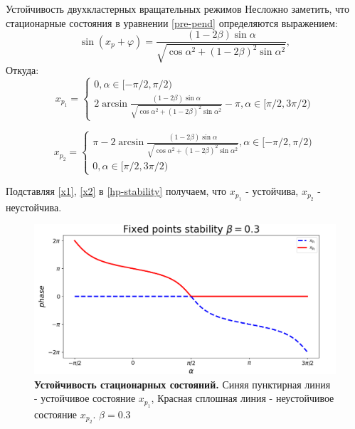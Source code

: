 \begin{chapter}{Устойчивость двухкластерных вращательных режимов}
	Несложно заметить, что стационарные состояния в уравнении \ref{pre-pend} определяются выражением:
	$$
	\sin{(x_p + \varphi)} = \frac{(1 - 2\beta) \sin{\alpha}}{\sqrt{\cos{\alpha}^2 + (1 - 2\beta)^2\sin{\alpha}^2}},
	$$
	Откуда:
	\begin{equation} \label{x1}
		x_{p_1} = \begin{cases}
			0, \alpha \in [-\pi/2, \pi/2) \\
			2\arcsin{\frac{(1 - 2\beta) \sin{\alpha}}{\sqrt{\cos{\alpha}^2 + (1 - 2\beta)^2\sin{\alpha}^2}}} - \pi , \alpha \in [\pi/2, 3\pi/2)
		\end{cases}
	\end{equation}
	
	\begin{equation} \label{x2}
	x_{p_2} = \begin{cases}
		\pi - 2\arcsin{\frac{(1 - 2\beta) \sin{\alpha}}{\sqrt{\cos{\alpha}^2 + (1 - 2\beta)^2\sin{\alpha}^2}}}, \alpha \in [-\pi/2, \pi/2) \\
		0, \alpha \in [\pi/2, 3\pi/2)
		\end{cases}
	\end{equation}
	
	Подставляя \ref{x1}, \ref{x2} в \ref{hp-stability}
	получаем, что $x_{p_1}$ - устойчива, $x_{p_2}$ - неустойчива.

	\begin{figure}[h!]\center		
		\includegraphics[width=1\columnwidth]{pictures/fixed-points.png} 
		\caption{\textbf{Устойчивость стационарных состояний.}
		Синяя пунктирная линия - устойчивое состояние $x_{p_1}$,
		Красная сплошная линия - неустойчивое состояние $x_{p_2}$.
		$\beta = 0.3$}
		\label{fp-2}
	\end{figure}


\end{chapter}
